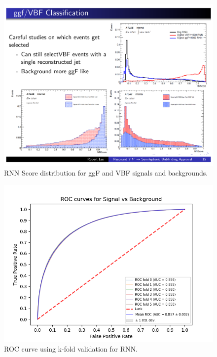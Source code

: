 \begin{figure}[h!]
  \centering
  \includegraphics[width=\hsize]{figures/Analysis/rnn.pdf}
  \caption{RNN Score distribution for ggF and VBF signals and backgrounds.} 
  \label{fig:rnn_score}
\end{figure}
\FloatBarrier



\begin{figure}[h!]
  \centering
  \includegraphics[width=\hsize]{figures/Analysis/kFold_ROC.png}
  \caption{ROC curve using k-fold validation for RNN.} 
  \label{fig:rnn_roc}
\end{figure}
\FloatBarrier



